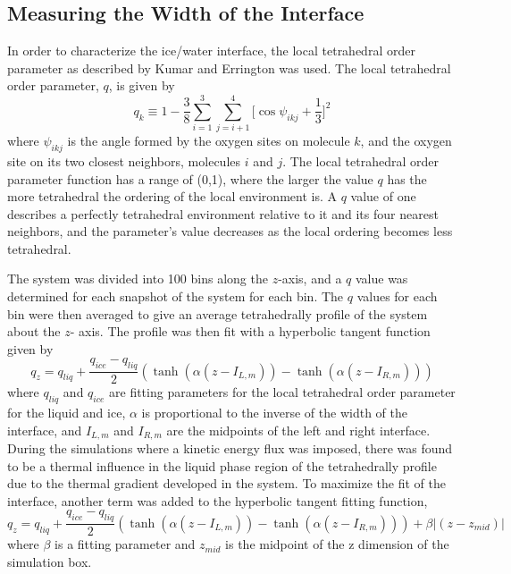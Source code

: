 \documentclass[journal = jpccck, manuscript = article]{achemso}
\begin{document}
\subsection{Measuring the Width of the Interface}
In order to characterize the ice/water interface, the local
tetrahedral order parameter as described by Kumar\cite{Kumar09} and
Errington\cite{Errington01} was used. The local tetrahedral order
parameter, $q$, is given by
\begin{equation}
q_{k} \equiv 1 -\frac{3}{8}\sum_{i=1}^{3} \sum_{j=i+1}^{4} \Bigg[\cos\psi_{ikj}+\frac{1}{3}\Bigg]^2
\end{equation}
where $\psi_{ikj}$ is the angle formed by the oxygen sites on molecule $k$, and the oxygen site on its two closest neighbors, molecules $i$ and $j$. The local tetrahedral order parameter function has a range of (0,1), where the larger the value $q$ has the more tetrahedral the ordering of the local environment is. A $q$ value of one describes a perfectly tetrahedral environment relative to it and its four nearest neighbors, and the parameter's value decreases as the local ordering becomes less tetrahedral.


The system was divided into 100 bins along the $z$-axis, and a $q$ value was determined for each snapshot of the system for each bin. The $q$ values for each bin were then averaged to give an average tetrahedrally profile of the system about the $z$- axis. The profile was then fit with a hyperbolic tangent function given by 
\begin{equation}
q_{z}=q_{liq}+\frac{q_{ice}-q_{liq}}{2}(\tanh(\alpha(z-I_{L,m}))-\tanh(\alpha(z-I_{R,m})))
\end{equation}
where $q_{liq}$ and $q_{ice}$ are fitting parameters for the local tetrahedral order parameter for the liquid and ice, $\alpha$ is proportional to the inverse of the width of the interface, and $I_{L,m}$ and $I_{R,m}$ are the midpoints of the left and right interface. During the simulations where a kinetic energy flux was imposed, there was found to be a thermal influence in the liquid phase region of the tetrahedrally profile due to the thermal gradient developed in the system. To maximize the fit of the interface, another term was added to the hyperbolic tangent fitting function,
\begin{equation}
q_{z}=q_{liq}+\frac{q_{ice}-q_{liq}}{2}(\tanh(\alpha(z-I_{L,m}))-\tanh(\alpha(z-I_{R,m})))+\beta|(z-z_{mid})|
\end{equation}
where $\beta$ is a fitting parameter and $z_{mid}$ is the midpoint of the z dimension of the simulation box. 
\end{document}
